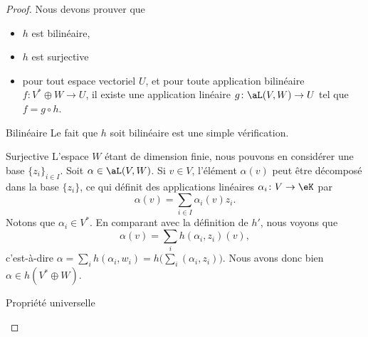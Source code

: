 \begin{proof}
    Nous devons prouver que
    \begin{itemize}
        \item \( h\) est bilinéaire,
        \item \( h\) est surjective
        \item pour tout espace vectoriel \( U\), et pour toute application bilinéaire \( f\colon V^*\oplus W\to U\), il existe une application linéaire \( g\colon \aL(V,W)\to U\) tel que \( f=g\circ h\).
    \end{itemize}

    \begin{subproof}
        \item[Bilinéaire]
            Le fait que \( h\) soit bilinéaire est une simple vérification.
        \item[Surjective]
            L'espace \( W\) étant de dimension finie, nous pouvons en considérer une base \( \{ z_i \}_{i\in I}\). Soit \( \alpha\in \aL(V,W)\). Si \( v\in V\), l'élément \( \alpha(v)\) peut être décomposé dans la base \( \{ z_i \}\), ce qui définit des applications linéaires \( \alpha_i\colon V\to \eK\) par
            \begin{equation}
                \alpha(v)=\sum_{i\in I}\alpha_i(v)z_i.
            \end{equation}
            Notons que \( \alpha_i\in V^*\). En comparant avec la définition de \( h'\), nous voyons que
            \begin{equation}
                \alpha(v)=\sum_i h(\alpha_i,z_i)(v),
            \end{equation}
            c'est-à-dire \( \alpha=\sum_ih(\alpha_i,w_i)=h\big( \sum_i(\alpha_i,z_i) \big)\). Nous avons donc bien \( \alpha\in h(V^*\oplus W)\).
        \item[Propriété universelle]


\end{subproof}
\end{proof}
